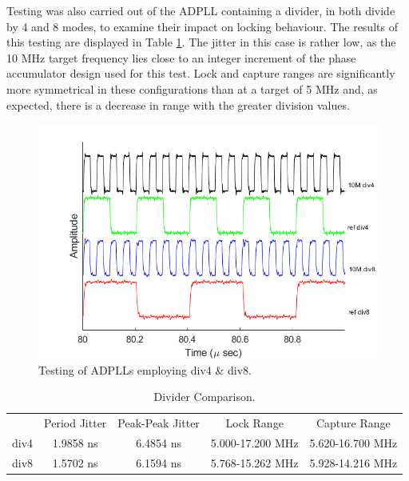 \documentclass[11pt,english,british]{report}
\begin{document}
Testing was also carried out of the ADPLL containing a divider, in both divide by 4 and 8 modes, to examine their impact on locking behaviour. The results of this testing are displayed in Table \ref{table:b_c_perf}. The jitter in this case is rather low, as the 10 MHz target frequency lies close to an integer increment of the phase accumulator design used for this test. Lock and capture ranges are significantly more symmetrical in these configurations than at a target of 5 MHz and, as expected, there is a decrease in range with the greater division values.
\begin{figure}[h]
	\centering
	\includegraphics[scale=0.5]{../matlab/painintheass}
	\caption{Testing of ADPLLs employing div4 \& div8.}
	\label{fig:div}
\end{figure}
\begin{table}[!ht]
	\begin{center} 
		\begin{tabular}{c|c|c|c|c}           
			& Period Jitter & Peak-Peak Jitter & Lock Range & Capture Range \\
			div4 & 1.9858 ns & 6.4854 ns & 5.000-17.200 MHz & 5.620-16.700 MHz \\
			div8 & 1.5702 ns & 6.1594 ns & 5.768-15.262 MHz & 5.928-14.216 MHz \\
		\end{tabular}
		\caption{Divider Comparison.}
		\label{table:b_c_perf}
	\end{center}
\end{table}
\end{document}
